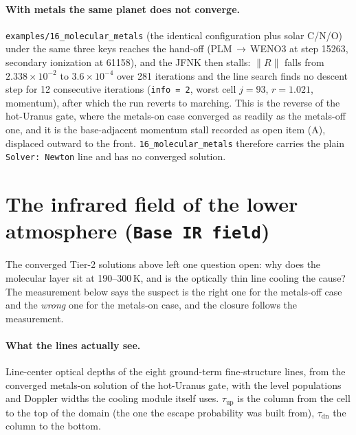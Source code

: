 \documentclass[english,a4paper]{my_memo}
\begin{document}
\paragraph{With metals the same planet does not converge.}
\texttt{examples/16\_molecular\_metals} (the identical configuration plus solar
C/N/O) under the same three keys reaches the hand-off
(PLM\,$\to$\,WENO3 at step 15263, secondary ionization at 61158), and the JFNK
then stalls: $\|R\|$ falls from $2.338\times10^{-2}$ to $3.6\times10^{-4}$ over
281 iterations and the line search finds no descent step for 12 consecutive
iterations (\texttt{info = 2}, worst cell $j=93$, $r=1.021$, momentum), after
which the run reverts to marching. This is the reverse of the hot-Uranus gate,
where the metals-on case converged as readily as the metals-off one, and it is the
base-adjacent momentum stall recorded as open item (A),
displaced outward to the front. \texttt{16\_molecular\_metals} therefore carries
the plain \texttt{Solver: Newton} line and has no converged solution.

\section{The infrared field of the lower atmosphere
(\texttt{Base IR field})}\label{sec:baseir}

The converged Tier-2 solutions above left one question open: why does the
molecular layer sit at 190--300\,K, and is the optically thin line cooling the
cause? The measurement below says the suspect is the right one for the metals-off
case and the \emph{wrong} one for the metals-on case, and the closure follows the
measurement.

\paragraph{What the lines actually see.} Line-center optical depths of the eight
ground-term fine-structure lines, from the converged metals-on solution of the
hot-Uranus gate, with the level populations and Doppler widths the cooling module
itself uses. $\tau_\mathrm{up}$ is the column from the cell to the top of the
domain (the one the escape probability was built from), $\tau_\mathrm{dn}$ the
column to the bottom.
\end{document}

